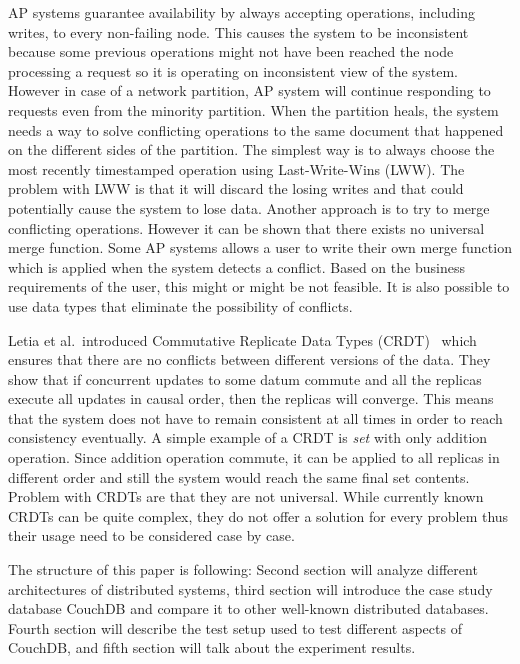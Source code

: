 AP systems guarantee availability by always accepting operations, including
writes, to every non-failing node. This causes the system to be inconsistent
because some previous operations might not have been reached the node
processing a request so it is operating on inconsistent view of the system.
However in case of a network partition, AP system will continue responding to
requests even from the minority partition. When the partition heals, the system
needs a way to solve conflicting operations to the same document that happened
on the different sides of the partition. The simplest way is to always choose the most recently timestamped
operation using Last-Write-Wins (LWW). The problem with LWW is that it will
discard the losing writes and that could potentially cause the system to lose
data.  Another approach is to try to merge conflicting operations. However it
can be shown that there exists no universal merge function. Some AP systems allows a user to write their own merge function which
is applied when the system detects a conflict.  Based on the business
requirements of the user, this might or might be not feasible. It is also
possible to use data types that eliminate the possibility of conflicts.

Letia et al.\ introduced Commutative Replicate Data Types
(CRDT)~\cite{letia2009crdts}\cite{letia2010crdtsconf} which ensures that there
are no conflicts between different versions of the data. They show that if
concurrent updates to some datum commute and all the replicas execute all
updates in causal order, then the replicas will converge. This means that the
system does not have to remain consistent at all times in order to reach
consistency eventually. A simple example of a CRDT is \emph{set} with only
addition operation. Since addition operation commute, it can be applied to all
replicas in different order and still the system would reach the same final set
contents. Problem with CRDTs are that they are not universal. While currently
known CRDTs can be quite complex, they do not offer a solution for every problem
thus their usage need to be considered case by case.

The structure of this paper is following: Second section will analyze different
architectures of distributed systems, third section will introduce the case
study database CouchDB and compare it to other well-known distributed databases.
Fourth section will describe the test setup used to test different aspects of
CouchDB, and fifth section will talk about the experiment results.
